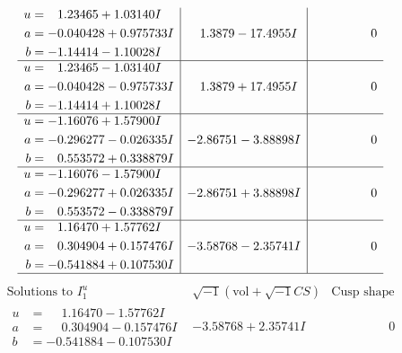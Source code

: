 \documentclass[1p]{elsarticle_modified}
\theoremstyle{definition}
\newcommand{\I}{\sqrt{-1}}
\begin{document}
$$\begin{array}{c|c|c}
\begin{aligned}
u &= \phantom{-}1.23465 + 1.03140 I \\
a &= -0.040428 + 0.975733 I \\
b &= -1.14414 - 1.10028 I\end{aligned}
 & \phantom{-}1.3879 - 17.4955 I & \phantom{-0.000000 } 0 \\ \hline\begin{aligned}
u &= \phantom{-}1.23465 - 1.03140 I \\
a &= -0.040428 - 0.975733 I \\
b &= -1.14414 + 1.10028 I\end{aligned}
 & \phantom{-}1.3879 + 17.4955 I & \phantom{-0.000000 } 0 \\ \hline\begin{aligned}
u &= -1.16076 + 1.57900 I \\
a &= -0.296277 - 0.026335 I \\
b &= \phantom{-}0.553572 + 0.338879 I\end{aligned}
 & -2.86751 - 3.88898 I & \phantom{-0.000000 } 0 \\ \hline\begin{aligned}
u &= -1.16076 - 1.57900 I \\
a &= -0.296277 + 0.026335 I \\
b &= \phantom{-}0.553572 - 0.338879 I\end{aligned}
 & -2.86751 + 3.88898 I & \phantom{-0.000000 } 0 \\ \hline\begin{aligned}
u &= \phantom{-}1.16470 + 1.57762 I \\
a &= \phantom{-}0.304904 + 0.157476 I \\
b &= -0.541884 + 0.107530 I\end{aligned}
 & -3.58768 - 2.35741 I & \phantom{-0.000000 } 0\\
 \hline 
 \end{array}$$\newpage$$\begin{array}{c|c|c}  
\text{Solutions to }I^u_{1}& \I (\text{vol} + \sqrt{-1}CS) & \text{Cusp shape}\\
 \hline 
\begin{aligned}
u &= \phantom{-}1.16470 - 1.57762 I \\
a &= \phantom{-}0.304904 - 0.157476 I \\
b &= -0.541884 - 0.107530 I\end{aligned}
 & -3.58768 + 2.35741 I & \phantom{-0.000000 } 0 \\ \hline\begin{aligned}

\end{aligned}
\end{array}$$
\end{document}
